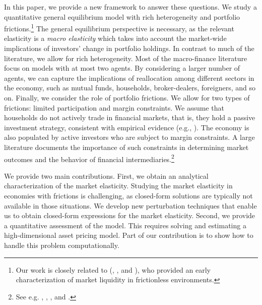 In this paper, we provide a new framework to answer these questions.
We study a quantitative general equilibrium model with rich heterogeneity and portfolio frictions.\footnote{Our work is closely related to \citeauthor{johnson2006dynamic} (\citeyear{johnson2006dynamic}, \citeyear{johnson2008volume}, and \citeyear{johnson2009liquid}), who provided an early characterization of market liquidity in frictionless environments.}
The general equilibrium perspective is necessary, as the relevant elasticity is a \textit{macro elasticity} which takes into account the market-wide implications of investors' change in portfolio holdings. 
In contrast to much of the literature, we allow for rich heterogeneity. 
Most of the macro-finance literature focus on models with at most two agents. By considering a larger number of agents, we can capture the implications of reallocation among different sectors in the economy, such as mutual funds, households, broker-dealers, foreigners, and so on. 
Finally, we consider the role of portfolio frictions. 
We allow for two types of frictions: limited participation and margin constraints. 
We assume that households do not actively trade in financial markets, that is, they hold a passive investment strategy, consistent with empirical evidence (e.g., \citealp{brunnermeier2008wealth}).
The economy is also populated by active investors who are subject to margin constraints. 
A large literature documents the importance of such constraints in determining market outcomes and the behavior of financial intermediaries.\footnote{See e.g. \citet{brunnermeier2009market}, \citet{garleanu2011margin}, \citet{chabakauri2013dynamic}, and \citet{adrian2014procyclical}.}

We provide two main contributions. First, we obtain an analytical characterization of the market elasticity. 
Studying the market elasticity in economies with frictions is challenging, as closed-form solutions are typically not available in those situations. 
We develop new perturbation techniques that enable us to obtain closed-form expressions for the market elasticity. 
Second, we provide a quantitative assessment of the model. 
This requires solving and estimating a high-dimensional asset pricing model. Part of our contribution is to show how to handle this problem computationally. 



